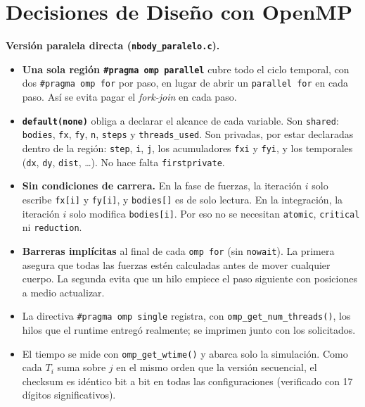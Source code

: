 \documentclass[11pt,a4paper]{article}
\begin{document}
\section{Decisiones de Diseño con OpenMP}
\textbf{Versión paralela directa (\texttt{nbody\_paralelo.c}).}
\begin{itemize}
    \item \textbf{Una sola región \texttt{\#pragma omp parallel}} cubre todo el ciclo temporal, con dos \texttt{\#pragma omp for} por paso, en lugar de abrir un \texttt{parallel for} en cada paso. Así se evita pagar el \textit{fork-join} en cada paso.
    \item \textbf{\texttt{default(none)}} obliga a declarar el alcance de cada variable. Son \texttt{shared}: \texttt{bodies}, \texttt{fx}, \texttt{fy}, \texttt{n}, \texttt{steps} y \texttt{threads\_used}. Son privadas, por estar declaradas dentro de la región: \texttt{step}, \texttt{i}, \texttt{j}, los acumuladores \texttt{fxi} y \texttt{fyi}, y los temporales (\texttt{dx}, \texttt{dy}, \texttt{dist}, \ldots). No hace falta \texttt{firstprivate}.
    \item \textbf{Sin condiciones de carrera.} En la fase de fuerzas, la iteración $i$ solo escribe \texttt{fx[i]} y \texttt{fy[i]}, y \texttt{bodies[]} es de solo lectura. En la integración, la iteración $i$ solo modifica \texttt{bodies[i]}. Por eso no se necesitan \texttt{atomic}, \texttt{critical} ni \texttt{reduction}.
    \item \textbf{Barreras implícitas} al final de cada \texttt{omp for} (sin \texttt{nowait}). La primera asegura que todas las fuerzas estén calculadas antes de mover cualquier cuerpo. La segunda evita que un hilo empiece el paso siguiente con posiciones a medio actualizar.
    \item La directiva \texttt{\#pragma omp single} registra, con \texttt{omp\_get\_num\_threads()}, los hilos que el runtime entregó realmente; se imprimen junto con los solicitados.
    \item El tiempo se mide con \texttt{omp\_get\_wtime()} y abarca solo la simulación. Como cada $T_i$ suma sobre $j$ en el mismo orden que la versión secuencial, el checksum es idéntico bit a bit en todas las configuraciones (verificado con 17 dígitos significativos).
\end{itemize}
\end{document}
